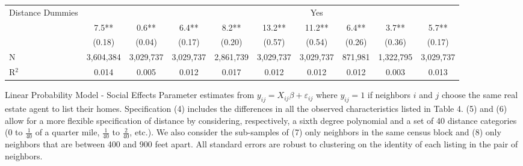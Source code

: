 \documentclass[12pt]{article}
\newcommand{\se}[1]{\footnotesize{(#1)}}
\newcommand{\fn}[1]{\footnotesize{#1}}
\begin{document}
\begin{sidewaystable}[ht]
\begin{tabular}{@{}lccccccccc@{}}
Distance Dummies                  &  &  &         &         &             &Yes &         &  &    \\\addlinespace
\multirow{2}{*}{Constant}                &7.5**    &0.6**    &6.4**    &8.2**    &13.2**   &11.2**   &6.4**    &3.7**    & 5.7**   \\
                                         &\se{0.18}&\se{0.04}&\se{0.17}&\se{0.20}&\se{0.57}&\se{0.54}&\se{0.26}&\se{0.36}&\se{0.17}\\\midrule
N          &\fn{3,604,384}&\fn{3,029,737}&\fn{3,029,737}&\fn{2,861,739}&\fn{3,029,737}&\fn{3,029,737}&\fn{871,981}&\fn{1,322,795}&\fn{3,029,737}\\
R$^2$                       &\fn{0.014}&\fn{0.005}&\fn{0.012}&\fn{0.017}&\fn{0.012}&\fn{0.012}&\fn{0.012}&\fn{0.003}&\fn{0.013}   \\\bottomrule
\end{tabular}
\begin{minipage}{.88\hsize}
{\footnotesize
    Linear Probability Model - Social Effects
    Parameter estimates from $y_{ij} = X_{ij}\beta + \varepsilon_{ij}$
    where $y_{ij} = 1$ if neighbors $i$ and $j$ choose the same real estate agent to list their homes.
    Specification (4) includes the differences in all the observed characteristics listed in Table 4. (5) and (6) allow for a more flexible specification of distance by considering, respectively, a sixth degree polynomial and a set of 40 distance categories (0 to $\frac{1}{40}$ of a quarter mile, $\frac{1}{40}$ to $\frac{2}{40}$, etc.).
    We also consider the sub-samples of (7) only neighbors in the same census block and (8) only neighbors that are between 400 and 900 feet apart.  All standard errors are robust to clustering on the identity of each listing in the pair of neighbors.}
\end{minipage}
\end{sidewaystable}
\end{document}
